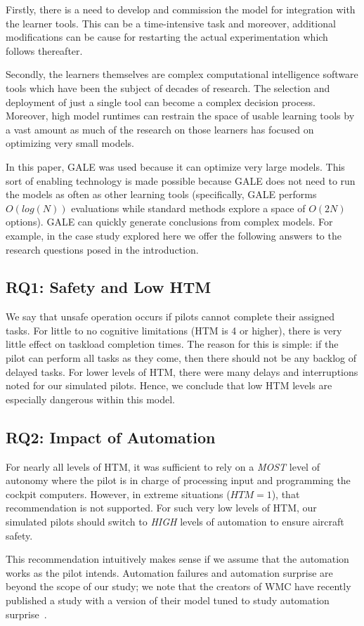 \documentclass[journal]{IEEEtran}
\newenvironment{changed}{\par}{\par}
\begin{document}
Firstly, there is a need to develop and commission the model for integration
with the learner tools.  
This can be a time-intensive task and moreover, additional modifications can be cause for restarting the actual experimentation which follows thereafter.  

Secondly, the learners themselves are complex computational intelligence software tools which have been the subject of decades of research.  
The selection and deployment of just a single tool can become a complex decision
process.  
Moreover, high model runtimes can restrain the space of usable learning tools by a vast amount as much of the research on those learners has focused on optimizing very small models.  

In this paper, GALE was used because it can optimize very large models.  
This sort of enabling technology is made possible because GALE does not need to run the models as often as other learning tools (specifically, GALE performs $O(log(N))$ evaluations while standard methods explore a space of $O(2N)$ options).
GALE can quickly generate conclusions from complex models. 
For example, in the case study explored here we offer the following answers to the research questions posed in the introduction.




\subsection{RQ1: Safety and Low HTM}
We say that unsafe operation occurs if pilots cannot complete their assigned tasks.
For little to no cognitive limitations (HTM is 4 or higher), there is very little effect on taskload completion times.  
The reason for this is simple: if the pilot can perform all tasks as they come, then there should not be any backlog of delayed tasks.  
For lower levels of HTM, there were many delays and interruptions noted for our simulated pilots. 
Hence, we conclude that low HTM levels are especially dangerous within this model.

\subsection{RQ2: Impact of Automation}

For nearly all levels of HTM, it was sufficient to rely on a {\em MOST} level of autonomy where the pilot is in charge of processing input and programming the cockpit computers.
However, in extreme situations ($\mathit{HTM}=1$), that recommendation is not supported.  
For such very low levels of HTM, our simulated pilots should switch to {\em HIGH} levels of automation to ensure aircraft safety.
\begin{changed}
This recommendation intuitively makes sense if we assume that the automation works as the pilot intends.
Automation failures and automation surprise are beyond the scope of our study; we note that the creators of WMC have recently published a study with a version of their model tuned to study automation surprise~\cite{Gelman2014}.
\end{changed}
\end{document}
